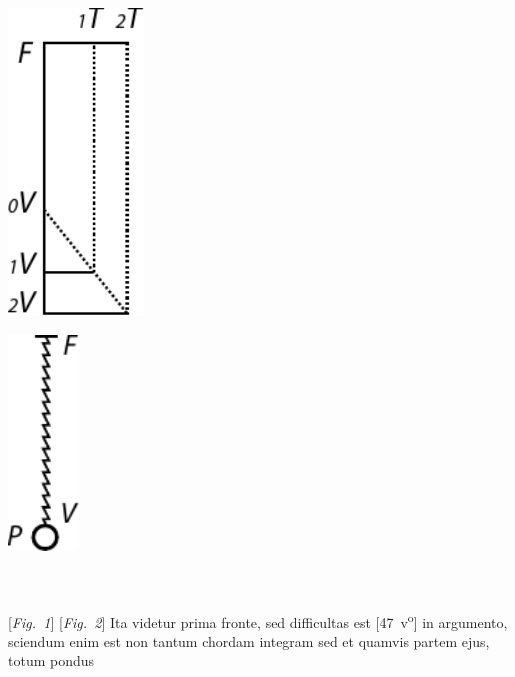 \begin{minipage}[t]{0.5\textwidth}
\includegraphics[width=0.27\textwidth]{gesamttex/edit_VIII,3/images/LH_35_14_02_047_d1.pdf}
\end{minipage}
\hspace{5mm}
\begin{minipage}[t]{0.5\textwidth}
\includegraphics[width=0.14\textwidth]{gesamttex/edit_VIII,3/images/LH_35_14_02_047_d2.pdf}
\end{minipage}
\\
\\
\hspace*{27mm} [\textit{Fig.~1}]\label{LH_35_14_02_047r_Fig.1}\hspace*{56mm} [\textit{Fig.~2}]\label{LH_35_14_02_047r_Fig.2}
\pend
\vspace{1.5em}
\pstart%
Ita videtur prima fronte, sed difficultas est
%
[47~v\textsuperscript{o}] %
%
in argumento,
sciendum enim est
non tantum chordam\protect{} integram
sed et quamvis partem ejus,
totum pondus
